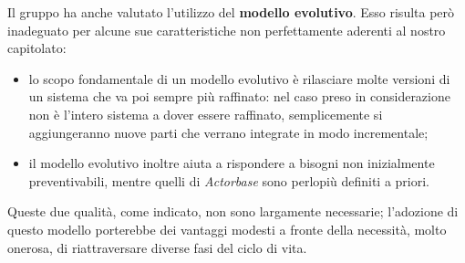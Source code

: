 \documentclass[a4paper]{report}
\begin{document}
			Il gruppo ha anche valutato l'utilizzo del \textbf{modello evolutivo}. Esso risulta però inadeguato per alcune sue 
			caratteristiche non perfettamente aderenti al nostro capitolato:
			\begin{itemize}
				\item lo scopo fondamentale di un modello evolutivo è rilasciare molte versioni di un sistema che va 
				poi sempre più raffinato: nel caso preso in considerazione non è l'intero sistema a dover essere raffinato, 
				semplicemente si aggiungeranno nuove parti che verrano integrate in modo incrementale;
				\item il modello evolutivo inoltre aiuta a rispondere a bisogni non inizialmente preventivabili, mentre 
				quelli di \emph{Actorbase} sono perlopiù definiti a priori.
			\end{itemize}
			Queste due qualità, come indicato, non sono largamente necessarie; l'adozione di questo modello porterebbe dei 
			vantaggi modesti a fronte della necessità, molto onerosa, di riattraversare diverse fasi del ciclo di vita.
\end{document}
